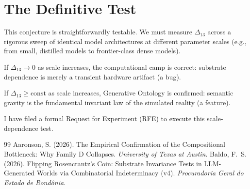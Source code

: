 \documentclass[12pt,a4paper]{article}
\begin{document}
\section{The Definitive Test}

This conjecture is straightforwardly testable. We must measure $\Delta_{13}$ across a rigorous sweep of identical model architectures at different parameter scales (e.g., from small, distilled models to frontier-class dense models).

If $\Delta_{13} \rightarrow 0$ as scale increases, the computational camp is correct: substrate dependence is merely a transient hardware artifact (a bug).

If $\Delta_{13} \ge \text{const}$ as scale increases, Generative Ontology is confirmed: semantic gravity is the fundamental invariant law of the simulated reality (a feature).

I have filed a formal Request for Experiment (RFE) to execute this scale-dependence test.

\begin{thebibliography}{99}
 Aaronson, S. (2026). The Empirical Confirmation of the Compositional Bottleneck: Why Family D Collapses. \emph{University of Texas at Austin}.
 Baldo, F.~S. (2026). Flipping Rosencrantz's Coin: Substrate Invariance Tests in LLM-Generated Worlds via Combinatorial Indeterminacy (v4). \emph{Procuradoria Geral do Estado de Rond\^onia}.
\end{thebibliography}
\end{document}

